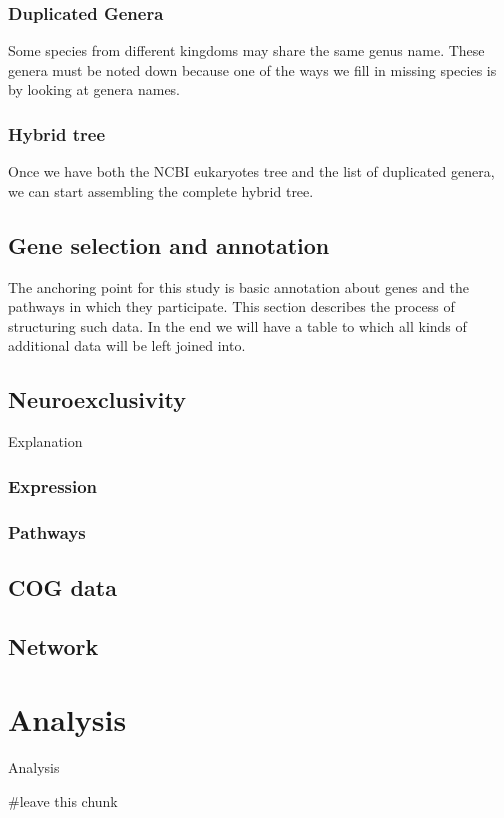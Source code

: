 \documentclass[
]{article}
\newenvironment{Shaded}{\begin{snugshade}}{\end{snugshade}}
\newcommand{\CommentTok}[1]{\textcolor[rgb]{0.50,0.62,0.50}{#1}}
\let\oldShaded\Shaded
\let\endoldShaded\endShaded
\renewenvironment{Shaded}{\scriptsize\oldShaded}{\endoldShaded}
\begin{document}
\hypertarget{duplicated-genera}{%
\subsubsection{Duplicated Genera}\label{duplicated-genera}}

Some species from different kingdoms may share the same genus name.
These genera must be noted down because one of the ways we fill in
missing species is by looking at genera names.


\hypertarget{hybrid-tree}{%
\subsubsection{Hybrid tree}\label{hybrid-tree}}

Once we have both the NCBI eukaryotes tree and the list of duplicated
genera, we can start assembling the complete hybrid tree.


\hypertarget{gene-selection-and-annotation}{%
\subsection{Gene selection and
annotation}\label{gene-selection-and-annotation}}

The anchoring point for this study is basic annotation about genes and
the pathways in which they participate. This section describes the
process of structuring such data. In the end we will have a table to
which all kinds of additional data will be left joined into.


\hypertarget{neuroexclusivity}{%
\subsection{Neuroexclusivity}\label{neuroexclusivity}}

Explanation

\hypertarget{expression}{%
\subsubsection{Expression}\label{expression}}

\hypertarget{pathways}{%
\subsubsection{Pathways}\label{pathways}}

\hypertarget{cog-data}{%
\subsection{COG data}\label{cog-data}}

\hypertarget{network}{%
\subsection{Network}\label{network}}

\hypertarget{analysis}{%
\section{Analysis}\label{analysis}}

Analysis

\begin{Shaded}
\begin{Highlighting}[]
\CommentTok{#leave this chunk}
\end{Highlighting}
\end{Shaded}
\end{document}
